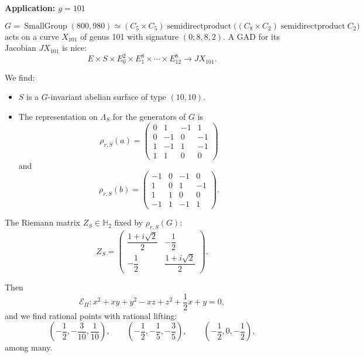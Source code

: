\medskip\noindent
{\bf Application: $g=101$}

$$
G=\operatorname{SmallGroup}(800,980)
\simeq
(C_5\times C_5)
\operatorname{semidirectproduct}
\bigl((C_8\times
C_2)\operatorname{semidirectproduct} C_2\bigr)
$$
acts on a curve $X_{101}$ of genus 101
with signature $(0;8,8,2)$. A GAD for its
Jacobian $JX_{101}$ is nice:
\begin{equation}
\label{equation-gad-genus-101}
E\times S\times E_0^2\times E_1^8
\times\cdots\times E_{12}^8
\longrightarrow JX_{101}.
\tag{3}
\end{equation}

We find:
\begin{itemize}
\item $S$ is a $G$-invariant abelian
surface of type $(10,10)$.

\item The representation on $\Lambda_S$
for the generators of $G$ is
$$
\rho_{r,S}(a)
=
\begin{pmatrix}
0&1&-1&1\\
0&-1&0&-1\\
1&-1&1&-1\\
1&1&0&0
\end{pmatrix}
$$
and
$$
\rho_{r,S}(b)
=
\begin{pmatrix}
-1&0&-1&0\\
1&0&1&-1\\
1&1&0&0\\
-1&1&-1&1
\end{pmatrix}.
$$
\end{itemize}

\medskip\noindent
The Riemann matrix
$Z_S\in\mathbb{H}_2$ fixed by
$\rho_{r,S}(G)$:
$$
Z_S
=
\begin{pmatrix}
\dfrac{1+i\sqrt{2}}{2}&-\dfrac12\\[6pt]
-\dfrac12&\dfrac{1+i\sqrt{2}}{2}
\end{pmatrix}.
$$

Then
$$
\mathcal{E}_{\Pi}\colon
x^2+xy+y^2-xz+z^2+\frac12x+y=0,
$$
and we find rational points with rational
lifting:
$$
\left(-\frac12,-\frac3{10},\frac1{10}\right),
\qquad
\left(-\frac12,-\frac15,-\frac35\right),
\qquad
\left(-\frac12,0,-\frac12\right),
$$
among many.

